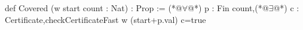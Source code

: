 def Covered (w start count : Nat) : Prop :=
  (*@$\forall$@*) p : Fin count,(*@$\exists$@*) c : Certificate,checkCertificateFast w (start+p.val) c=true
